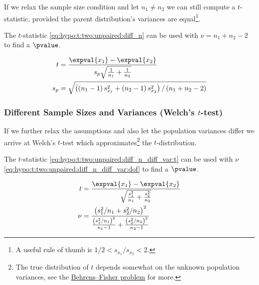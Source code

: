If we relax the sample size condition and let $n_{1} \neq n_{2}$
we can still compute a $t$-statistic,
provided the parent distribution's variances are equal\footnote{A useful rule of thumb is $1/2 < s_{x_{1}} / s_{x_{2}} < 2$.}.

The $t$-statistic \cref{eq:hypo:t:two:unpaired:diff_n} can be used with $\nu = n_{1} + n_{2} - 2$ to find a $\pvalue$.

\begin{subequations}\label{eq:hypo:t:two:unpaired:diff_n}
\begin{align}
t &= \frac{\expval{x_{1}} - \expval{x_{2}}}{s_{p} \sqrt{\frac{1}{n_{1}} + \frac{1}{n_{2}}}} \label{eq:hypo:t:two:unpaired:diff_n:t} \\
s_{p} &= \sqrt{\left(\left(n_{1} - 1\right)s^{2}_{x_{1}} + \left(n_{2} - 1\right)s^{2}_{x_{2}}\right)/\left(n_{1} + n_{2} -2\right)} \label{eq:hypo:t:two:unpaired:diff_n:s_p}
\end{align}
\end{subequations}

\subsubsection{Different Sample Sizes and Variances (Welch's \texorpdfstring{$t$}{t}-test)}
\label{hypo:t_test:two:unpaired:diff_n_diff_var}

If we further relax the assumptions and also let the population variances differ
we arrive at Welch's $t$-test which approximates\footnote{The
true distribution of $t$ depends somewhat on the unknown population variances,
see the \href{https://en.wikipedia.org/wiki/Behrens\%E2\%80\%93Fisher_problem}{Behrens--Fisher problem}
for more.} the $t$-distribution.

The $t$-statistic \cref{eq:hypo:t:two:unpaired:diff_n_diff_var:t} can be used with $\nu$ \cref{eq:hypo:t:two:unpaired:diff_n_diff_var:dof} to find a $\pvalue$.

\begin{subequations}\label{eq:hypo:t:two:unpaired:diff_n_diff_var}
\begin{align}
t &= \frac{\expval{x_{1}} - \expval{x_{2}}}{\sqrt{\frac{s^{2}_{1}}{n_{1}} + \frac{s^{2}_{2}}{n_{2}}}} \label{eq:hypo:t:two:unpaired:diff_n_diff_var:t} \\
\nu &= \frac{\left(s^{2}_{1}/n_{1} + s^{2}_{2}/n_{2}\right)^{2}}{\frac{\left(s^{2}_{1}/n_{1}\right)^{2}}{n_{1}-1} + \frac{\left(s^{2}_{2}/n_{2}\right)^{2}}{n_{2}-1}} \label{eq:hypo:t:two:unpaired:diff_n_diff_var:dof}
\end{align}
\end{subequations}

